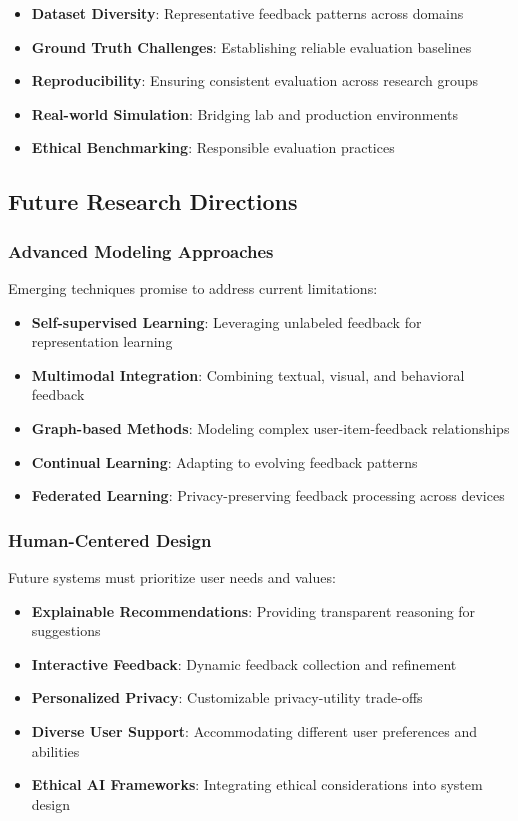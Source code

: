 \begin{itemize}
    \item \textbf{Dataset Diversity}: Representative feedback patterns across domains
    \item \textbf{Ground Truth Challenges}: Establishing reliable evaluation baselines
    \item \textbf{Reproducibility}: Ensuring consistent evaluation across research groups
    \item \textbf{Real-world Simulation}: Bridging lab and production environments
    \item \textbf{Ethical Benchmarking}: Responsible evaluation practices
\end{itemize}

\subsection{Future Research Directions}

\subsubsection{Advanced Modeling Approaches}

Emerging techniques promise to address current limitations:

\begin{itemize}
    \item \textbf{Self-supervised Learning}: Leveraging unlabeled feedback for representation learning
    \item \textbf{Multimodal Integration}: Combining textual, visual, and behavioral feedback
    \item \textbf{Graph-based Methods}: Modeling complex user-item-feedback relationships
    \item \textbf{Continual Learning}: Adapting to evolving feedback patterns
    \item \textbf{Federated Learning}: Privacy-preserving feedback processing across devices
\end{itemize}

\subsubsection{Human-Centered Design}

Future systems must prioritize user needs and values:

\begin{itemize}
    \item \textbf{Explainable Recommendations}: Providing transparent reasoning for suggestions
    \item \textbf{Interactive Feedback}: Dynamic feedback collection and refinement
    \item \textbf{Personalized Privacy}: Customizable privacy-utility trade-offs
    \item \textbf{Diverse User Support}: Accommodating different user preferences and abilities
    \item \textbf{Ethical AI Frameworks}: Integrating ethical considerations into system design
\end{itemize}

